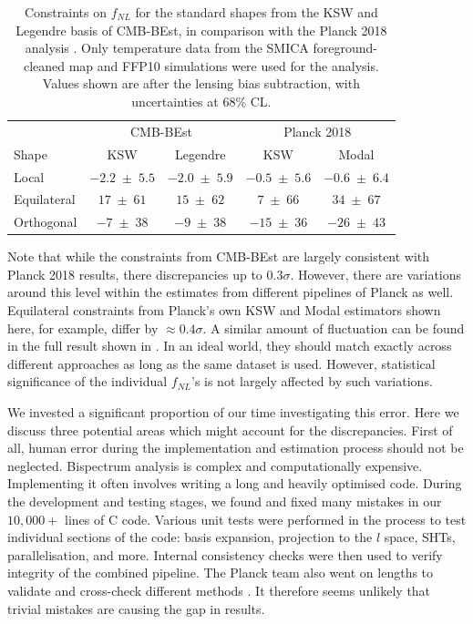 \begin{table}[h]
	\caption{Constraints on $f_{NL}$ for the standard shapes from the KSW and Legendre basis of CMB-BEst, in comparison with the Planck 2018 analysis \cite{PlanckCollaboration2018}. Only temperature data from the SMICA foreground-cleaned map and FFP10 simulations were used for the analysis. Values shown are after the lensing bias subtraction, with uncertainties at 68\% CL.}
	\centering
	\label{table:trio_fNL_comparison_with_planck}
	\renewcommand{\arraystretch}{1.5} 
	\begin{tabular}{lcccc}
		\toprule
		& \multicolumn{2}{c}{CMB-BEst} & \multicolumn{2}{c}{Planck 2018} \\ \cmidrule(lr){2-3} \cmidrule(lr){4-5}
		Shape & KSW &  Legendre &  KSW &  Modal \\
		\midrule
		
		Local & $-2.2 \;\pm\; 5.5$ & $-2.0 \;\pm\; 5.9$ & $-0.5 \;\pm\; 5.6$ & $-0.6 \;\pm\; 6.4$ \\
		Equilateral & $17 \;\pm\; 61$ & $15 \;\pm\; 62$ & $7 \;\pm\; 66$ & $34 \;\pm\; 67$ \\
		Orthogonal & $-7 \;\pm\; 38$ & $-9 \;\pm\; 38$ & $-15 \;\pm\; 36$ & $-26 \;\pm\; 43$ \\
		\bottomrule
	\end{tabular}
\end{table}

Note that while the constraints from CMB-BEst are largely consistent with Planck 2018 results, there discrepancies up to $0.3\sigma$. However, there are variations around this level within the estimates from different pipelines of Planck as well. Equilateral constraints from Planck's own KSW and Modal estimators shown here, for example, differ by $\approx 0.4\sigma$. A similar amount of fluctuation can be found in the full result shown in \cite{PlanckCollaboration2018}. In an ideal world, they should match exactly across different approaches as long as the same dataset is used. However, statistical significance of the individual $f_{NL}$'s is not largely affected by such variations.

We invested a significant proportion of our time investigating this error. Here we discuss three potential areas which might account for the discrepancies. First of all, human error during the implementation and estimation process should not be neglected. Bispectrum analysis is complex and computationally expensive. Implementing it often involves writing a long and heavily optimised code. During the development and testing stages, we found and fixed many mistakes in our $10,000+$ lines of \textsc{C} code. Various unit tests were performed in the process to test individual sections of the code: basis expansion, projection to the $l$ space, SHTs, parallelisation, and more. Internal consistency checks were then used to verify integrity of the combined pipeline. The Planck team also went on lengths to validate and cross-check different methods \cite{PlanckCollaboration2013}. It therefore seems unlikely that trivial mistakes are causing the gap in results.

